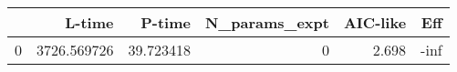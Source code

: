 \begin{tabular}{lrrrrr}
\toprule
{} &       L-time &     P-time &  N\_params\_expt &  AIC-like &  Eff \\
\midrule
0 &  3726.569726 &  39.723418 &              0 &     2.698 & -inf \\
\bottomrule
\end{tabular}
